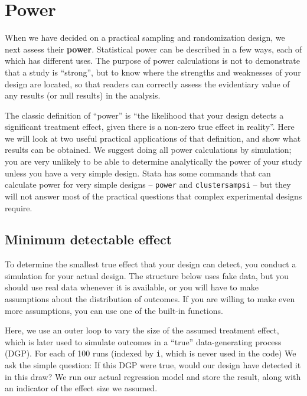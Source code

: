 {
}


\section{Power}

When we have decided on a practical sampling and randomization design,
we next assess their \textbf{power}.
Statistical power can be described in a few ways,
each of which has different uses.
The purpose of power calculations is not to
demonstrate that a study is ``strong'',
but to know where the strengths and weaknesses
of your design are located, so that readers
can correctly assess the evidentiary value of
any results (or null results) in the analysis.

The classic definition of ``power'' is
``the likelihood that your design detects a significant treatment effect,
given there is a non-zero true effect in reality''.
Here we will look at two useful practical applications
of that definition, and show what results can be obtained.
We suggest doing all power calculations by simulation;
you are very unlikely to be able to determine analytically
the power of your study unless you have a very simple design.
Stata has some commands that can calculate power for
very simple designs -- \texttt{power} and \texttt{clustersampsi} --
but they will not answer most of the practical questions
that complex experimental designs require.

\subsection{Minimum detectable effect}

To determine the smallest true effect that your design can detect,
you conduct a simulation for your actual design.
The structure below uses fake data,
but you should use real data whenever it is available,
or you will have to make assumptions about the distribution of outcomes.
If you are willing to make even more assumptions,
you can use one of the built-in functions.

Here, we use an outer loop to vary the size of the assumed treatment effect,
which is later used to simulate outcomes in a ``true''
data-generating process (DGP).
For each of 100 runs (indexed by \texttt{i}, which is never used in the code)
We ask the simple question: If this DGP were true,
would our design have detected it in this draw?
We run our actual regression model and store the result,
along with an indicator of the effect size we assumed.

